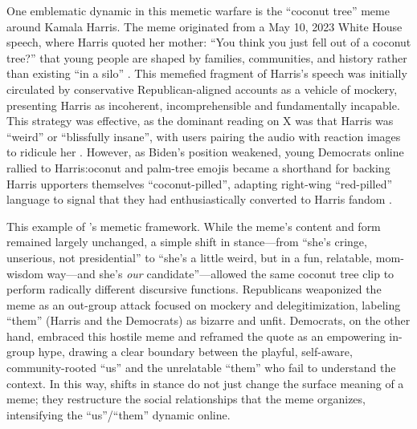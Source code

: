 \documentclass[12pt,twoside]{article}
\begin{document}

One emblematic dynamic in this memetic warfare is the ``coconut tree'' meme around Kamala Harris. The meme originated from a May 10, 2023 White House speech, where Harris quoted her mother: ``You think you just fell out of a coconut tree?'' that young people are shaped by families, communities, and history rather than existing ``in a silo'' \parencite{harris2023swearinginremarks}. This memefied fragment of Harris's speech was initially circulated by conservative Republican-aligned accounts as a vehicle of mockery, presenting Harris as incoherent, incomprehensible and fundamentally incapable. This strategy was effective, as the dominant reading on X was that Harris was ``weird'' or ``blissfully insane'', with users pairing the audio with reaction images to ridicule her \parencite{carry2024coconuttreeguide}. However, as Biden's position weakened, young Democrats online rallied to Harris:oconut and palm-tree emojis became a shorthand for backing Harris \parencite{coleman2024coconutmeme}upporters themselves ``coconut-pilled'', adapting right-wing ``red-pilled'' language to signal that they had enthusiastically converted to Harris fandom \parencite{roberts2024coconuttreeorganic}.

This example of \textcite{shifman2013memesdigitalculture}'s memetic framework.  While the meme's content and form remained largely unchanged,
a simple shift in stance---from ``she's cringe, unserious, not presidential'' to ``she's a little weird, but in a fun, relatable, mom-wisdom way—and she's \textit{our} candidate''---allowed the same coconut tree clip to perform radically different discursive functions. Republicans weaponized the meme as an out-group attack focused on mockery and delegitimization, labeling ``them'' (Harris and the Democrats) as bizarre and unfit. Democrats, on the other hand, embraced this hostile meme and reframed the quote as an empowering in-group hype, drawing a clear boundary between the playful, self-aware, community-rooted ``us'' and the unrelatable ``them'' who fail to understand the context. In this way, shifts in stance do not just change the surface meaning of a meme; they restructure the social relationships that the meme organizes, intensifying the ``us''/``them'' dynamic online.
\end{document}
